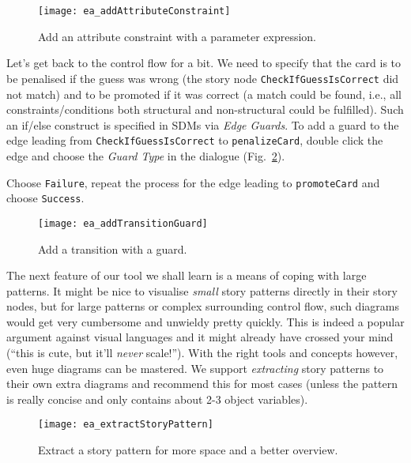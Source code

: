 \begin{figure}[htbp]
\begin{center}
  \texttt{[image: ea\_addAttributeConstraint]}
  \caption{Add an attribute constraint with a parameter expression.}
  \label{fig:sdm_check_att_constraint}
\end{center}
\end{figure}

Let's get back to the control flow for a bit.  We need to specify that the card is to be penalised if the guess was wrong (the story node
\texttt{Check\-If\-Guess\-Is\-Correct} did not match) and to be promoted if it was correct (a match could be found, i.e., all constraints/conditions both
 structural and non-structural could be fulfilled). Such an if/else construct is specified in SDMs via \emph{Edge Guards}. To add a guard to
the edge leading from \texttt{Check\-If\-Guess\-Is\-Correct} to \texttt{penalize\-Card}, double click the edge and choose the \emph{Guard Type}
in the dialogue (Fig.~\ref{fig:sdm_check_guard}).

Choose \texttt{Failure}, repeat the process for the edge leading to \texttt{promoteCard} and choose \texttt{Success}.

\begin{figure}[htbp]
\begin{center}
  \texttt{[image: ea\_addTransitionGuard]}
  \caption{Add a transition with a guard.}
  \label{fig:sdm_check_guard}
\end{center}
\end{figure}


The next feature of our tool we shall learn is a means of coping with large patterns. It might be nice to visualise \emph{small} story patterns directly in
their story nodes, but for large patterns or complex surrounding control flow, such diagrams would get very cumbersome and unwieldy pretty quickly.  This is
indeed a popular argument against visual languages and it might already have crossed your mind (``this is cute, but it'll \emph{never} scale!''). With the right
tools and concepts however, even huge diagrams can be mastered. We support \emph{extracting} story patterns to their own extra
diagrams and recommend this for most cases (unless the pattern is really concise and only contains about 2-3 object variables).

\begin{figure}[htbp]
\begin{center}
  \texttt{[image: ea\_extractStoryPattern]}
  \caption{Extract a story pattern for more space and a better overview.}
  \label{fig:sdm_check_extract_storypattern}
\end{center}
\end{figure}

